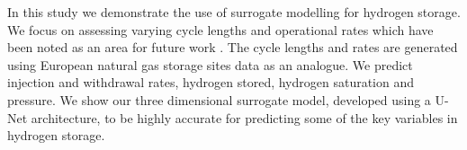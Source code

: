 In this study we demonstrate the use of surrogate modelling for hydrogen storage. We focus on assessing varying cycle lengths and operational rates which have been noted as an area for future work \citep{mao2025deep}. The cycle lengths and rates are generated using European natural gas storage sites data as an analogue. We predict injection and withdrawal rates, hydrogen stored, hydrogen saturation and pressure. We show our three dimensional surrogate model, developed using a U-Net architecture, to be highly accurate for predicting some of the key variables in hydrogen storage.